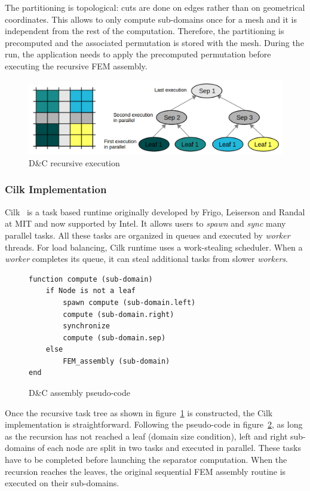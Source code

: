 \documentclass{IOS-Book-Article}
\begin{document}
The partitioning is topological: cuts are done on edges rather than on geometrical coordinates.
This allows to only compute sub-domains once for a mesh and it is independent from the rest of the computation.
Therefore, the partitioning is precomputed and the associated permutation is stored with the mesh.
During the run, the application needs to apply the precomputed permutation before executing the recursive FEM assembly.
\begin{figure}[htp]
 \centering
 \includegraphics[scale=0.25]{DC_recursion.png}
 \caption{D\&C recursive execution}
 \label{fig:DCrec}
\end{figure}

\subsubsection{Cilk Implementation}
Cilk~\cite{cilk5} is a task based runtime originally developed by Frigo, Leiserson and Randal at MIT and now supported by Intel.
It allows users to \emph{spawn} and \emph{sync} many parallel tasks.
All these tasks are organized in queues and executed by \emph{worker} threads.
For load balancing, Cilk runtime uses a work-stealing scheduler. When a \emph{worker} completes its queue, it can steal additional tasks from slower \emph{workers}.

\begin{figure}[htp]
\small
 \begin{verbatim}
function compute (sub-domain) 
    if Node is not a leaf
        spawn compute (sub-domain.left)
        compute (sub-domain.right)
        synchronize
        compute (sub-domain.sep)
    else
        FEM_assembly (sub-domain)
end        
 \end{verbatim}
 \caption{D\&C assembly pseudo-code}
 \label{fig:DCcode}
\end{figure}

Once the recursive task tree as shown in figure~\ref{fig:DCrec} is constructed, the Cilk implementation is straightforward.
Following the pseudo-code in figure~\ref{fig:DCcode}, as long as the recursion has not reached a leaf (domain size condition), left and right sub-domains of each node are split in two tasks and executed in parallel.
These tasks have to be completed before launching the separator computation. 
When the recursion reaches the leaves, the original sequential FEM assembly routine is executed on their sub-domains.
\end{document}
